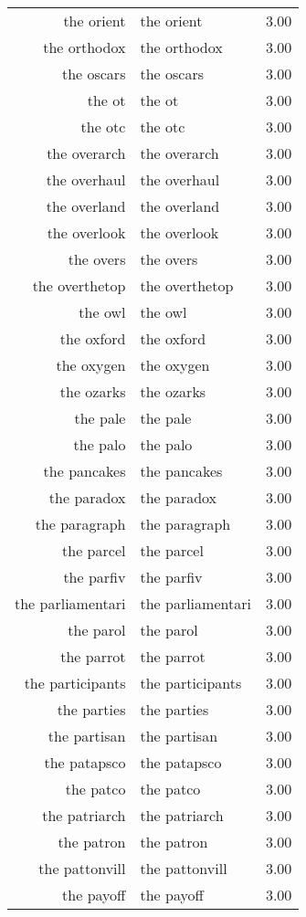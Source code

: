 \begin{table}[ht]
\begin{tabular}{rlr}
  the orient & the orient & 3.00 \\ 
  the orthodox & the orthodox & 3.00 \\ 
  the oscars & the oscars & 3.00 \\ 
  the ot & the ot & 3.00 \\ 
  the otc & the otc & 3.00 \\ 
  the overarch & the overarch & 3.00 \\ 
  the overhaul & the overhaul & 3.00 \\ 
  the overland & the overland & 3.00 \\ 
  the overlook & the overlook & 3.00 \\ 
  the overs & the overs & 3.00 \\ 
  the overthetop & the overthetop & 3.00 \\ 
  the owl & the owl & 3.00 \\ 
  the oxford & the oxford & 3.00 \\ 
  the oxygen & the oxygen & 3.00 \\ 
  the ozarks & the ozarks & 3.00 \\ 
  the pale & the pale & 3.00 \\ 
  the palo & the palo & 3.00 \\ 
  the pancakes & the pancakes & 3.00 \\ 
  the paradox & the paradox & 3.00 \\ 
  the paragraph & the paragraph & 3.00 \\ 
  the parcel & the parcel & 3.00 \\ 
  the parfiv & the parfiv & 3.00 \\ 
  the parliamentari & the parliamentari & 3.00 \\ 
  the parol & the parol & 3.00 \\ 
  the parrot & the parrot & 3.00 \\ 
  the participants & the participants & 3.00 \\ 
  the parties & the parties & 3.00 \\ 
  the partisan & the partisan & 3.00 \\ 
  the patapsco & the patapsco & 3.00 \\ 
  the patco & the patco & 3.00 \\ 
  the patriarch & the patriarch & 3.00 \\ 
  the patron & the patron & 3.00 \\ 
  the pattonvill & the pattonvill & 3.00 \\ 
  the payoff & the payoff & 3.00 \\ 

\end{tabular}
\end{table}
